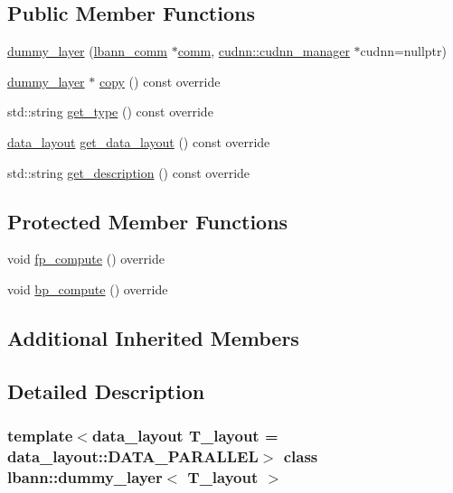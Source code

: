 \subsection*{Public Member Functions}
\begin{DoxyCompactItemize}
\item 
\hyperlink{classlbann_1_1dummy__layer_aed5bc546171348eaaf91aaf196406440}{dummy\+\_\+layer} (\hyperlink{classlbann_1_1lbann__comm}{lbann\+\_\+comm} $\ast$\hyperlink{file__io_8cpp_ab048c6f9fcbcfaa57ce68b00263dbebe}{comm}, \hyperlink{classlbann_1_1cudnn_1_1cudnn__manager}{cudnn\+::cudnn\+\_\+manager} $\ast$cudnn=nullptr)
\item 
\hyperlink{classlbann_1_1dummy__layer}{dummy\+\_\+layer} $\ast$ \hyperlink{classlbann_1_1dummy__layer_a673315d873a571bd4b3cacfeffff329c}{copy} () const override
\item 
std\+::string \hyperlink{classlbann_1_1dummy__layer_a060a484950e1ba36ce49bb2af3e409ec}{get\+\_\+type} () const override
\item 
\hyperlink{base_8hpp_a786677cbfb3f5677b4d84f3056eb08db}{data\+\_\+layout} \hyperlink{classlbann_1_1dummy__layer_a3cc37758086f3c4824619504e4ee869b}{get\+\_\+data\+\_\+layout} () const override
\item 
std\+::string \hyperlink{classlbann_1_1dummy__layer_ab4921788ac99636ba95ba51aaa4394fe}{get\+\_\+description} () const override
\end{DoxyCompactItemize}
\subsection*{Protected Member Functions}
\begin{DoxyCompactItemize}
\item 
void \hyperlink{classlbann_1_1dummy__layer_a4d59be5e984ebd1d6d16d17bb26f3486}{fp\+\_\+compute} () override
\item 
void \hyperlink{classlbann_1_1dummy__layer_a7d2a802a280bb93f2e07d0af88610335}{bp\+\_\+compute} () override
\end{DoxyCompactItemize}
\subsection*{Additional Inherited Members}


\subsection{Detailed Description}
\subsubsection*{template$<$data\+\_\+layout T\+\_\+layout = data\+\_\+layout\+::\+D\+A\+T\+A\+\_\+\+P\+A\+R\+A\+L\+L\+EL$>$\newline
class lbann\+::dummy\+\_\+layer$<$ T\+\_\+layout $>$}

